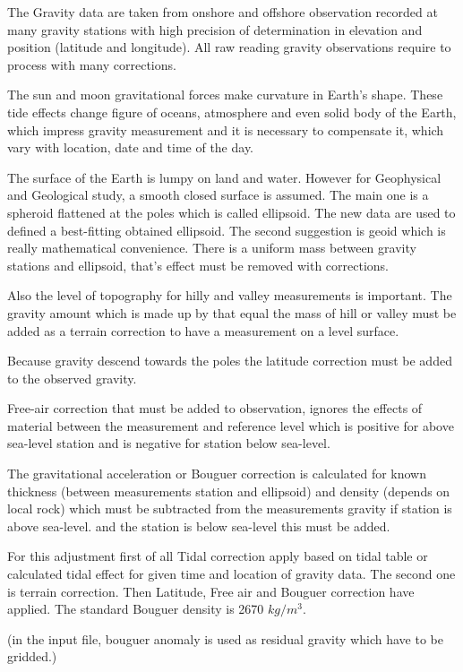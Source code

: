 The Gravity data are taken from onshore and offshore observation recorded at many gravity stations with high precision 
of determination in elevation and position (latitude and longitude). All raw reading gravity observations require 
to process with many corrections.

The sun and moon gravitational forces make curvature in Earth's shape. These tide effects change figure of oceans, 
atmosphere and even solid body of the Earth, which impress gravity measurement and it is necessary to compensate it,
 which vary with location, date and time of the day.

The surface of the Earth is lumpy on land and water. However for Geophysical and Geological study, a smooth closed 
surface is assumed. The main one is a spheroid flattened at the poles which is called ellipsoid. The new 
data are used to defined a best-fitting obtained ellipsoid. The second suggestion is geoid which 
is really mathematical convenience. There is a uniform mass between gravity stations and ellipsoid, that's 
effect must be removed with corrections.

Also the level of topography for hilly and valley measurements is important. The gravity amount which is 
made up by that equal the mass of hill or valley must be added as a terrain correction to have a measurement on a level surface.

Because gravity descend towards the poles the latitude correction must be added to the observed gravity.

Free-air correction that must be added to observation, ignores the effects of material between the measurement 
and reference level which is positive for above sea-level station and is negative for station below sea-level.

The gravitational acceleration or Bouguer correction is calculated for known thickness (between measurements
station and ellipsoid) and density (depends on local rock) which must be subtracted from the measurements 
gravity if station is above sea-level. and the station is below sea-level this must be added.

For this adjustment first of all Tidal correction apply based on tidal table or calculated tidal effect 
for given time and location of gravity data. The second one is terrain correction. Then Latitude, Free air and
Bouguer correction have applied. The standard Bouguer density is 2670 $kg/m^3$.

(in the input file, bouguer anomaly is used as residual gravity  which have to be gridded.)




